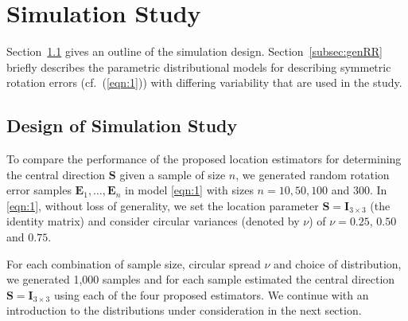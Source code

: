 \section{Simulation Study}\label{ch:simulation}

Section~\ref{subsec:simdesign} gives an outline of the simulation design.  Section~\ref{subsec:genRR} briefly describes the parametric distributional models for describing symmetric rotation errors (cf.~(\ref{eqn:1})) with differing variability that are used in the study. 
\subsection{Design of Simulation Study}
\label{subsec:simdesign}
To compare the performance of the proposed location estimators for determining the central direction $\bm{S}$ given a sample of size $n$, we generated random rotation error samples  $\bm E_1, \ldots, \bm E_n$  in model \eqref{eqn:1} with sizes $n=10, 50, 100$ and 300. In \eqref{eqn:1}, without loss of generality, we set the location parameter $\bm S=\bm I_{3\times 3}$ (the identity matrix) and consider circular variances (denoted  by $\nu$) of $\nu=0.25$, $0.50$ and $0.75$. 

For each combination of sample size, circular spread $\nu$ and choice of distribution, we generated 1,000 samples and for each sample estimated the central direction  $\bm S=\bm I_{3\times 3}$ using each of the four proposed estimators.  We continue with an introduction to the distributions under consideration in the next section.


